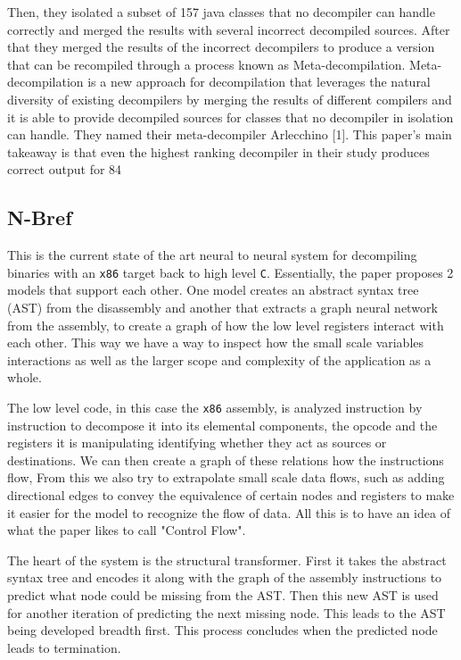 \documentclass{article}
\begin{document}
Then, they isolated a subset of 157 java classes that no decompiler can handle correctly and merged the results with several incorrect decompiled sources.
After that they merged the results of the incorrect decompilers to produce a version that can be recompiled through a process known as Meta-decompilation. Meta-decompilation is a new approach for decompilation that leverages the natural diversity of existing decompilers by merging the results of different compilers and it is able to provide decompiled sources for classes that no decompiler in isolation can handle. They named their meta-decompiler Arlecchino [1].
This paper’s main takeaway is that even the highest ranking decompiler in their study produces correct output for 84%

\subsection{N-Bref}

This is the current state of the art neural to neural system for decompiling binaries with an \verb|x86| target back to high level \verb|C|.
Essentially, the paper proposes 2 models that support each other.
One model creates an abstract syntax tree (AST) from the disassembly and another that extracts a graph neural network from the assembly, to create a graph of how the low level registers interact with each other.
This way we have a way to inspect how the small scale variables interactions as well as the larger scope and complexity of the application as a whole.

The low level code, in this case the \verb|x86| assembly, is analyzed instruction by instruction to decompose it into its elemental components, the opcode and the registers it is manipulating identifying whether they act as sources or destinations.
We can then create a graph of these relations how the instructions flow,
From this we also try to extrapolate small scale data flows, such as adding directional edges to convey the equivalence of certain nodes and registers to make it easier for the model to recognize the flow of data.
All this is to have an idea of what the paper likes to call "Control Flow".

The heart of the system is the structural transformer.
First it takes the abstract syntax tree and encodes it along with the graph of the assembly instructions to predict what node could be missing from the AST.
Then this new AST is used for another iteration of predicting the next missing node.
This leads to the AST being developed breadth first.
This process concludes when the predicted node leads to termination.
\end{document}
